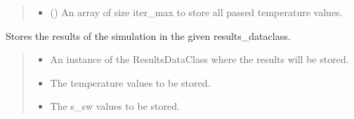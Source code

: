 \documentclass[a4paper,11pt,english,openany]{sphinxmanual}
\begin{document}
\begin{fulllineitems}
\begin{fulllineitems}
\begin{quote}
\begin{description}
\begin{itemize}
\item {} 
\sphinxAtStartPar
{} () \textendash{} An array of size iter\_max to store all passed temperature values.

\end{itemize}

\end{description}\end{quote}

\end{fulllineitems}


\begin{fulllineitems}
\label{\detokenize{api/spyice.parameters.results_params:spyice.parameters.results_params.ResultsParams.store_results}}
\pysigstartsignatures
{}
\pysigstopsignatures
\sphinxAtStartPar
Stores the results of the simulation in the given results\_dataclass.
\begin{quote}\begin{description}
\begin{itemize}
\item {} 
\sphinxAtStartPar
{} \textendash{} An instance of the ResultsDataClass where the results will be stored.

\item {} 
\sphinxAtStartPar
{} \textendash{} The temperature values to be stored.

\item {} 
\sphinxAtStartPar
{} \textendash{} The s\_sw values to be stored.


\end{itemize}
\end{description}
\end{quote}
\end{fulllineitems}
\end{fulllineitems}
\end{document}
